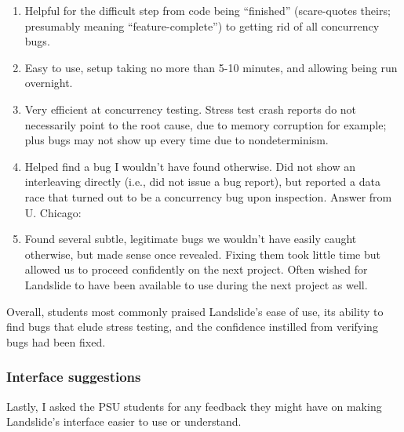 \begin{enumerate}
	\item Helpful for the difficult step from code being ``finished'' (scare-quotes theirs; presumably meaning ``feature-complete'')
		to getting rid of all concurrency bugs.
	\item Easy to use, setup taking no more than 5-10 minutes, and allowing being run overnight.
	\item Very efficient at concurrency testing.
		Stress test crash reports do not necessarily point to the root cause, due to memory corruption for example;
		plus bugs may not show up every time due to nondeterminism.
	\item Helped find a bug I wouldn't have found otherwise.
		Did not show an interleaving directly (i.e., did not issue a bug report),
		but reported a data race that turned out to be a concurrency bug upon inspection.
Answer from U. Chicago:
	\item Found several subtle, legitimate bugs we wouldn't have easily caught otherwise, but made sense once revealed.
		Fixing them took little time but allowed us to proceed confidently on the next project.
		Often wished for Landslide to have been available to use during the next project as well.
\end{enumerate}

\noindent
Overall, students most commonly praised Landslide's ease of use,
its ability to find bugs that elude stress testing,
and the confidence instilled from verifying bugs had been fixed.

\subsubsection{Interface suggestions}

Lastly, I asked the PSU students for any feedback they might have on making Landslide's interface easier to use or understand.

